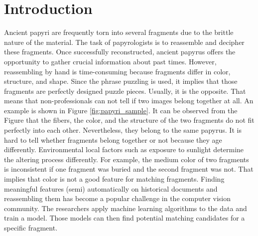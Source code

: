 \chapter{Introduction}
\label{chap:intro}
Ancient papyri are frequently torn into several fragments due to the brittle nature of the material. The task of papyrologists is to reassemble and decipher these fragments. Once successfully reconstructed, ancient papyrus offers the opportunity to gather crucial information about past times. However, reassembling by hand is time-consuming because fragments differ in color, structure, and shape. Since the phrase puzzling is used, it implies that those fragments are perfectly designed puzzle pieces. Usually, it is the opposite. That means that non-professionals can not tell if two images belong together at all. An example is shown in Figure \ref{fig:papyri_sample}. It can be observed from the Figure that the fibers, the color, and the structure of the two fragments do not fit perfectly into each other. Nevertheless, they belong to the same papyrus. It is hard to tell whether fragments belong together or not because they age differently. Environmental local factors such as exposure to sunlight determine the altering process differently. For example, the medium color of two fragments is inconsistent if one fragment was buried and the second fragment was not. That implies that color is not a good feature for matching fragments. Finding meaningful features (semi) automatically on historical documents and reassembling them has become a popular challenge in the computer vision community. The researchers apply machine learning algorithms to the data and train a model. Those models can then find potential matching candidates for a specific fragment.\\

